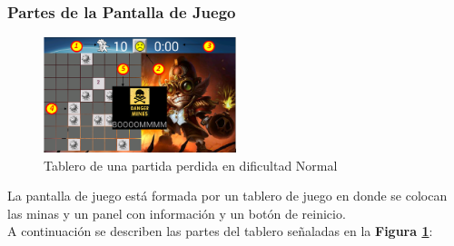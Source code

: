 \documentclass[11pt]{article} %
\begin{document}
\newpage
\thispagestyle{empty}

\subsubsection{\textbf{Partes de la Pantalla de Juego}}

\begin{center}

	\begin{figure}[h!]
  		\centering
    		\includegraphics[width=0.5\textwidth]{imagenes/partesdeltablero1.PNG}
  		\caption{Tablero de una partida perdida en dificultad Normal}
		\label{partesdeltablero}
	\end{figure}
\end{center}

La pantalla de juego est\'a formada por un tablero de juego en donde se colocan las minas y un panel con informaci\'on y un bot\'on de reinicio.
\\A continuaci\'on se describen las partes del tablero se\~naladas en la \textbf{Figura \ref{partesdeltablero}}:
\end{document}
